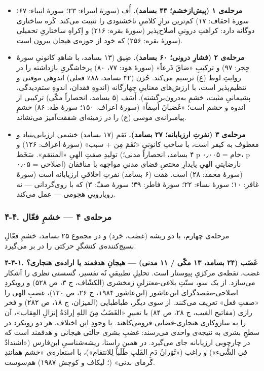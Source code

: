 \documentclass[12pt,a4paper]{article}
\providecommand{\tightlist}{\setlength{\itemsep}{0pt}\setlength{\parskip}{0pt}}
\begin{document}
\begin{RTL}
\begin{otherlanguage}{persian}
\begin{itemize}
\tightlist
\item
  \textbf{مرحله‌ی ۱ (پیش‌ازخشم؛ ۴۴ بسامد).} أُف (سورۀ اسراء: ۲۳؛ سورۀ
  انبیاء: ۶۷؛ سورۀ احقاف: ۱۷) کم‌ترین ترازِ کلامیِ ناخشنودی را تثبیت می‌کند.
  کَره ساختاری دوگانه دارد: کراهتِ درونیِ اصلاح‌پذیر (سورۀ بقره: ۲۱۶) و
  اِکراهِ ساختاریِ تحمیلی (سورۀ بقره: ۲۵۶) که خود از حوزه‌ی هیجان بیرون است.
\item
  \textbf{مرحله‌ی ۲ (فشارِ درونی؛ ۶۰ بسامد).} ضِیق (۱۳ بسامد، با شاهدِ
  کانونیِ سورۀ حِجر: ۹۷) و ترکیبِ «ضاقَ ذَرعاً» (سورۀ هود: ۷۷، ۸۰) پرخاشگریِ
  بازداشته را در روایتِ لوط (ع) ترسیم می‌کند. حُزن (۴۲ بسامد، ۸۸٪ فعلی)
  اندوهی موقتی و تنظیم‌پذیر است، با ارزش‌های معناییِ چهارگانه (اندوهِ فقدان،
  اندوهِ ستم‌دیدگی، پشیمانیِ مثبت، خشمِ به‌درون‌برگشته). أَسَف (۵ بسامد، انحصاراً
  مکّی) ترکیبی از اندوه و خشم است؛ «غَضبانَ أَسِفاً» (سورۀ اعراف: ۱۵۰؛ سورۀ
  طه: ۸۶) خشمِ پیامبرانه‌ی موسی (ع) را در زمینه‌ای شفقت‌آمیز می‌نشاند.
\item
  \textbf{مرحله‌ی ۳ (نفرتِ ارزیابانه؛ ۲۷ بسامد).} نَقم (۱۷ بسامد) خشمی
  ارزیابی‌بنیاد و معطوف به کیفر است، با ساختِ کانونیِ «نَقَمَ مِن + سبب» (سورۀ
  اعراف: ۱۲۶) و تولیدِ صفتِ الهیِ «المنتقم». سَخَط (۴ بسامد، انحصاراً مدنی؛ p
  خام = ۰٫۰۰۵، p اصلاحی = ۰٫۰۵) نارضایتیِ الهیِ پایدارِ مختصِ فضای مدنیِ
  مواجهه با منافقان (سورۀ محمد: ۲۸) است. مَقت (۶ بسامد) نفرتِ اخلاقیِ
  ارزیابانه است (سورۀ غافر: ۱۰؛ سورۀ نساء: ۲۲؛ سورۀ فاطر: ۳۹؛ سورۀ صفّ:
  ۳) که با روی‌گردانی --- نه رویاروییِ هجومی --- عمل می‌کند.
\end{itemize}

\subsubsection{۴-۴. مرحله‌ی ۴ --- خشمِ
فعّال}\label{ux645ux631ux62dux644ux647ux6cc-ux6f4-ux62eux634ux645-ux641ux639ux627ux644}

مرحله‌ی چهارم، با دو ریشه (غضب، حَرد) و در مجموع ۲۵ بسامد، خشمِ فعّالِ
بسیج‌کننده‌ی کنشگرِ حرکتی را در بر می‌گیرد.

\textbf{۴-۴-۱. غَضَب (۲۴ بسامد، ۱۳ مکّی / ۱۱ مدنی) --- هیجانِ هدفمند یا
اراده‌ی هنجاری؟} غضب، نقطه‌ی مرکزیِ پیوستار است. تحلیلِ تطبیقیِ نُه تفسیر،
گسستی نظری را آشکار می‌سازد. از یک سو، سنّتِ بلاغی-معتزلیِ زمخشری (الکشّاف، ج
۳، ص ۵۲۸) و رویکردِ اصلاحی-مقصدگرای ابن‌عاشور (ابن‌عاشور ۱۹۸۴، ج ۲۶، ص
۱۲۰)، غضبِ الهی را «صفتِ فعل» تعریف می‌کنند. از سوی دیگر، طباطبایی
(المیزان، ج ۱۸، ص ۲۸۲) و فخر رازی (مفاتیح الغیب، ج ۲۸، ص ۸۴) با تعبیرِ
«الغَضَبُ مِنَ اللهِ إرادَةُ إنزالِ العِقاب»، آن را به سازوکاری هنجاری-قضایی
فرومی‌کاهند. با وجودِ این اختلاف، هر دو رویکرد در سطحِ بشری به نتیجه‌ی واحدی
می‌رسند: غضبِ بشری حالتی هیجانی و هدفمند است که در چارچوبی ارزیابانه جای
می‌گیرد. در همین راستا، ریشه‌شناسیِ ابن‌فارس («اشتدادٌ فی الشَّیء») و راغب
(«ثَوَرانُ دَمِ القَلبِ طَلَباً لِلانتقام»)، با استعاره‌ی «خشم همانندِ گرمای بدنی»
(؛ لیکاف و کوچش ۱۹۸۷) هم‌سوست.


\end{otherlanguage}
\end{RTL}
\end{document}
